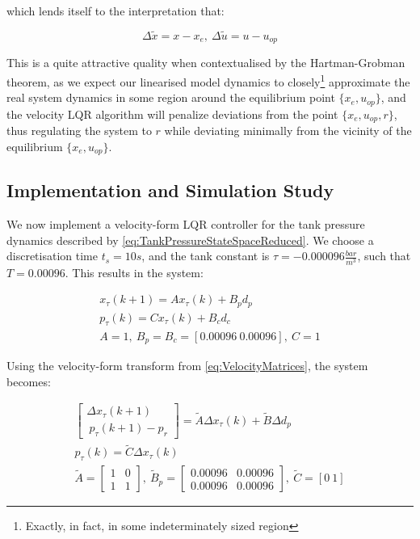 which lends itself to the interpretation that:

\begin{equation}\label{eq:DeltaInterpretation}
	\Delta \tilde{x} = x-x_e, \ \Delta \tilde{u} = u-u_{op}
\end{equation}

\clearpage

This is a quite attractive quality when contextualised by the Hartman-Grobman theorem, as we expect our linearised model dynamics to closely\footnote{Exactly, in fact, in some indeterminately sized region} approximate the real system dynamics in some region around the equilibrium point $\{x_e,u_{op}\}$, and the velocity LQR algorithm will penalize deviations from the point $\{x_e,u_{op},r\}$, thus regulating the system to $r$ while deviating minimally from the vicinity of the equilibrium $\{x_e,u_{op}\}$.

\subsection{Implementation and Simulation Study}\label{subsec:LQRSimulationStudy}

We now implement a velocity-form LQR controller for the tank pressure dynamics described by \cref{eq:TankPressureStateSpaceReduced}. We choose a discretisation time $t_s = 10 \si{s}$, and the tank constant is $\tau = -0.000096 \frac{\si{bar}}{\si{m^3}}$, such that $T = 0.00096$. This results in the system:

\begin{equation}\label{eq:TankPressureMatrices}
	\begin{gathered}
		x_\tau(k+1) = A x_\tau(k) + B_pd_p \\
		p_\tau(k) = Cx_\tau(k) + B_cd_c \\
		A = 1, \ B_p = B_c = [0.00096 \ 0.00096], \ C = 1	
	\end{gathered}
\end{equation}

Using the velocity-form transform from \cref{eq:VelocityMatrices}, the system becomes:

\begin{equation}\label{eq:TankPressureVelocityMatrices}
\begin{gathered}
	 \begin{bmatrix}\Delta	x_\tau(k+1) \\\ p_\tau(k+1)-p_{r}
	\end{bmatrix} = \tilde{A} \Delta x_\tau(k) + \tilde{B}\Delta d_p \\
	p_\tau(k) = \tilde{C}\Delta x_\tau(k) \\
	\tilde{A} = \begin{bmatrix} 1 & 0 \\ 1 & 1 \end{bmatrix},
	 \ \tilde{B}_p = \begin{bmatrix} 0.00096 & 0.00096 \\ 0.00096 & 0.00096
	\end{bmatrix}, \ \tilde{C} = [0 \ 1]	
\end{gathered}
\end{equation}




